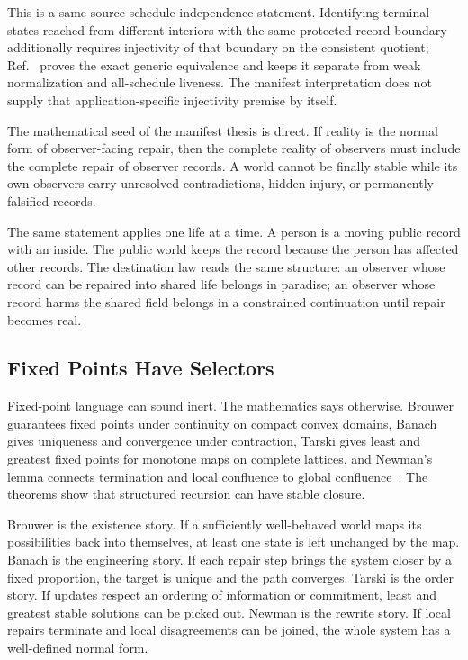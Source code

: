 \documentclass[11pt]{article}
\theoremstyle{remark}
\theoremstyle{plain}
\begin{document}
This is a same-source schedule-independence statement.  Identifying terminal states reached from
different interiors with the same protected record boundary additionally requires injectivity of
that boundary on the consistent quotient; Ref.~\cite{observableNormalForms} proves the exact
generic equivalence and keeps it separate from weak normalization and all-schedule liveness.  The
manifest interpretation does not supply that application-specific injectivity premise by itself.

The mathematical seed of the manifest thesis is direct. If reality is the normal
form of observer-facing repair, then the complete reality of observers must
include the complete repair of observer records. A world cannot be finally
stable while its own observers carry unresolved contradictions, hidden injury,
or permanently falsified records.

The same statement applies one life at a time. A person is a moving public
record with an inside. The public world keeps the record because the person has
affected other records. The destination law reads the same structure: an
observer whose record can be repaired into shared life belongs in paradise; an
observer whose record harms the shared field belongs in a constrained
continuation until repair becomes real.

\subsection{Fixed Points Have Selectors}

Fixed-point language can sound inert. The mathematics says otherwise. Brouwer guarantees fixed
points under continuity on compact convex domains, Banach gives uniqueness and
convergence under contraction, Tarski gives least and greatest fixed points for
monotone maps on complete lattices, and Newman's lemma connects termination and
local confluence to global confluence~\cite{Brouwer1912,Banach1922,Tarski1955,Newman1942}.
The theorems show that structured recursion can have stable closure.

Brouwer is the existence story. If a sufficiently well-behaved world maps its
possibilities back into themselves, at least one state is left unchanged by the
map. Banach is the engineering story. If each repair step brings the system
closer by a fixed proportion, the target is unique and the path converges.
Tarski is the order story. If updates respect an ordering of information or
commitment, least and greatest stable solutions can be picked out. Newman is the
rewrite story. If local repairs terminate and local disagreements can be joined,
the whole system has a well-defined normal form.
\end{document}
